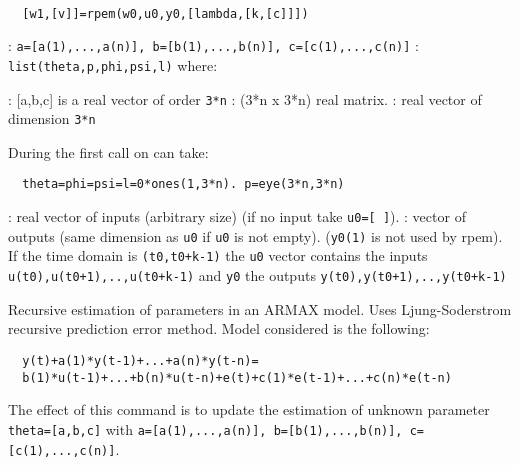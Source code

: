 \begin{mandesc}
   \\ %
\end{mandesc}
\begin{calling_sequence}
\begin{verbatim}
  [w1,[v]]=rpem(w0,u0,y0,[lambda,[k,[c]]])  
\end{verbatim}
\end{calling_sequence}
\begin{parameters}
  \begin{varlist}
    : \verb!a=[a(1),...,a(n)], b=[b(1),...,b(n)], c=[c(1),...,c(n)]!
    : \verb!list(theta,p,phi,psi,l)! where:
    \begin{varlist}
      : [a,b,c] is a real vector of order \verb!3*n!
      : (3*n x 3*n) real matrix.
      : real vector of dimension \verb!3*n!
    \end{varlist}
    During the first call on can take:
\begin{verbatim}
  theta=phi=psi=l=0*ones(1,3*n). p=eye(3*n,3*n)
\end{verbatim}
    : real vector of inputs (arbitrary size) (if no input take \verb!u0=[ ]!).
    : vector of outputs (same dimension as \verb!u0! if \verb!u0! is not empty). (\verb!y0(1)! is not used by rpem).
    If the time domain is \verb!(t0,t0+k-1)! the \verb!u0! vector contains the inputs 
    \verb!u(t0),u(t0+1),..,u(t0+k-1)! and \verb!y0! the outputs 
    \verb!y(t0),y(t0+1),..,y(t0+k-1)!
  \end{varlist}
\end{parameters}
\begin{mandescription}
  Recursive estimation of parameters in an ARMAX model.
  Uses Ljung-Soderstrom recursive prediction error method.
  Model considered is the following:
\begin{verbatim}
  y(t)+a(1)*y(t-1)+...+a(n)*y(t-n)=
  b(1)*u(t-1)+...+b(n)*u(t-n)+e(t)+c(1)*e(t-1)+...+c(n)*e(t-n)
\end{verbatim}
The effect of this command is to update the estimation of
unknown parameter \verb!theta=[a,b,c]! with
\verb!a=[a(1),...,a(n)], b=[b(1),...,b(n)], c=[c(1),...,c(n)]!.
\end{mandescription}
